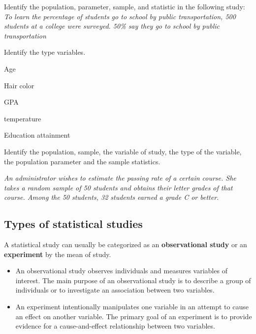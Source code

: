 \begin{example}
  Identify the population, parameter, sample, and statistic in the following study: \textit{To learn the   percentage of students go to school by public transportation, 500
  students at a college were surveyed. 50\% say they go to school by
  public transportation}
\end{example}
\vspace*{2\baselineskip}

\begin{example}
  Identify the type variables.\\
\begin{enumerate*}
  \item Age
  \item Hair color
  \item GPA
  \item temperature
  \item Education attainment
\end{enumerate*}
\end{example}


\begin{exercise}
Identify the population, sample, the variable of study, the type of the
variable, the population parameter and the sample statistics.

\emph{An administrator wishes to estimate the passing rate of a certain
course. She takes a random sample of 50 students and obtains their
letter grades of that course. Among the 50 students, 32 students earned
a grade C or better.}
\end{exercise}
\vspace*{3\baselineskip}

\hypertarget{types-of-statistical-studies}{%
\subsection{Types of statistical
studies}\label{types-of-statistical-studies}}

  A statistical study can usually be categorized as an
  \textbf{observational study} or an \textbf{experiment} by the mean of
  study.

  \begin{itemize}
  \item
    An observational study observes individuals and measures variables
    of interest. The main purpose of an observational study is to
    describe a group of individuals or to investigate an association
    between two variables.
  \item
    An experiment intentionally manipulates one variable in an attempt
    to cause an effect on another variable. The primary goal of an
    experiment is to provide evidence for a cause-and-effect
    relationship between two variables.
  \end{itemize}

